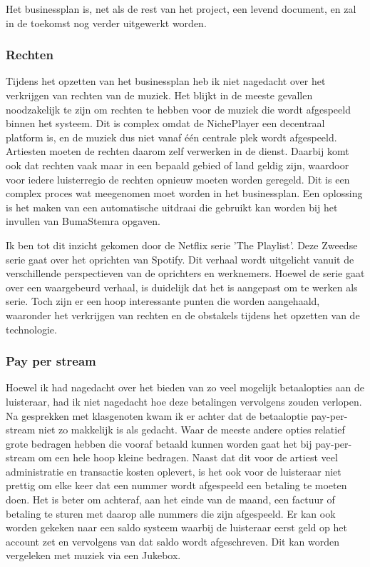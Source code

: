 Het businessplan is, net als de rest van het project, een levend document, en zal in de toekomst nog verder uitgewerkt worden.

\subsubsection*{Rechten}
Tijdens het opzetten van het businessplan heb ik niet nagedacht over het verkrijgen van rechten van de muziek. Het blijkt in de meeste gevallen noodzakelijk te zijn om rechten te hebben voor de muziek die wordt afgespeeld binnen het systeem. Dit is complex omdat de NichePlayer een decentraal platform is, en de muziek dus niet vanaf één centrale plek wordt afgespeeld. Artiesten moeten de rechten daarom zelf verwerken in de dienst. Daarbij komt ook dat rechten vaak maar in een bepaald gebied of land geldig zijn, waardoor voor iedere luisterregio de rechten opnieuw moeten worden geregeld. Dit is een complex proces wat meegenomen moet worden in het businessplan. Een oplossing is het maken van een automatische uitdraai die gebruikt kan worden bij het invullen van BumaStemra opgaven.

Ik ben tot dit inzicht gekomen door de Netflix serie 'The Playlist'. Deze Zweedse serie gaat over het oprichten van Spotify. Dit verhaal wordt uitgelicht vanuit de verschillende perspectieven van de oprichters en werknemers. Hoewel de serie gaat over een waargebeurd verhaal, is duidelijk dat het is aangepast om te werken als serie. Toch zijn er een hoop interessante punten die worden aangehaald, waaronder het verkrijgen van rechten en de obstakels tijdens het opzetten van de technologie.

\subsubsection*{Pay per stream}
Hoewel ik had nagedacht over het bieden van zo veel mogelijk betaalopties aan de luisteraar, had ik niet nagedacht hoe deze betalingen vervolgens zouden verlopen. Na gesprekken met klasgenoten kwam ik er achter dat de betaaloptie pay-per-stream niet zo makkelijk is als gedacht. Waar de meeste andere opties relatief grote bedragen hebben die vooraf betaald kunnen worden gaat het bij pay-per-stream om een hele hoop kleine bedragen. Naast dat dit voor de artiest veel administratie en transactie kosten oplevert, is het ook voor de luisteraar niet prettig om elke keer dat een nummer wordt afgespeeld een betaling te moeten doen. Het is beter om achteraf, aan het einde van de maand, een factuur of betaling te sturen met daarop alle nummers die zijn afgespeeld. Er kan ook worden gekeken naar een saldo systeem waarbij de luisteraar eerst geld op het account zet en vervolgens van dat saldo wordt afgeschreven. Dit kan worden vergeleken met muziek via een Jukebox.

